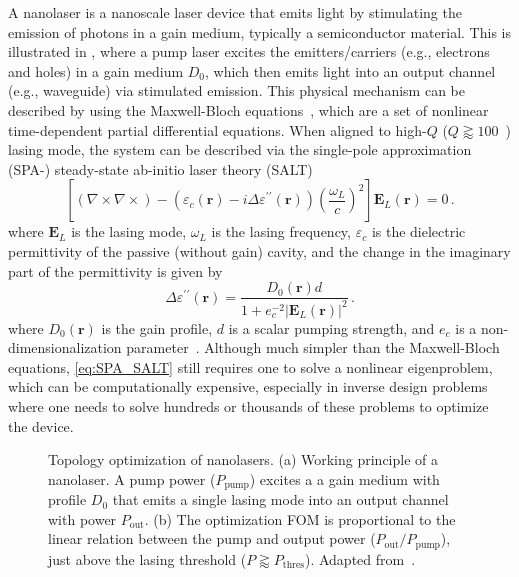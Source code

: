 A nanolaser is a nanoscale laser device that emits light by stimulating the emission of photons in a gain medium, typically a semiconductor material. This is illustrated
in , where a pump laser excites the emitters/carriers (e.g., electrons and holes) in a gain medium $D_0$, which then emits light into an output channel (e.g., waveguide) via
stimulated emission. This physical
mechanism can be described by using the Maxwell-Bloch equations~\cite{haken_laser_dynamics, PhysRev.134.A1429, SALT_original}, which are a set of nonlinear time-dependent 
partial differential equations. When aligned to high-$Q$ ($Q\gtrapprox 100$~\cite{cerjan_2016}) lasing
mode, the system can be described via the single-pole approximation (SPA-) steady-state ab-initio laser theory (SALT)~\cite{Ge_2010}
\begin{equation}\label{eq:SPA_SALT}
    {\left[(\nabla \times 
     \nabla \times ) -\left(\varepsilon_c(\mathbf{r})-i \Delta \varepsilon^{\prime \prime} (\mathbf{r})\right) \left(\frac{\omega_L}{c}\right)^2\right] \mathbf{E}_L(\mathbf{r})=0}\,.
\end{equation}
where $\mathbf{E}_L$ is the lasing mode, $\omega_L$ is the lasing frequency, $\varepsilon_c$ is the dielectric permittivity of the passive (without gain) cavity, and the change in the 
imaginary part of the permittivity is given by
\begin{equation}\label{eq:gain_SALT}
        \Delta \varepsilon^{\prime \prime} (\mathbf{r}) =  \frac{D_0(\mathbf{r}) d}{1+ e_c^{-2}\left|\mathbf{E}_L(\mathbf{r})\right|^2}\,.
\end{equation}
where $D_0(\mathbf{r})$ is the gain profile, $d$ is a scalar pumping strength, and $e_c$ is a non-dimensionalization parameter~\cite{Ge_2010}. Although much simpler than the Maxwell-Bloch equations, \eqref{eq:SPA_SALT} still
requires one to solve a nonlinear eigenproblem, which can be computationally expensive, especially in inverse design problems where one needs to solve hundreds or thousands of these problems to optimize the device.

\begin{figure}[tb]
    \centering
    \caption{Topology optimization of nanolasers. (a) Working principle of a nanolaser. A pump power ($P_\text{pump}$) excites a a gain medium with profile
    $D_0$ that emits a single lasing mode into an output channel with power $P_\text{out}$. (b) The optimization FOM is proportional to the linear relation between the pump and output power ($P_\text{out}/P_\text{pump}$),
    just above the lasing threshold ($P \gtrapprox P_\text{thres}$).  Adapted from~\cite{ownpub4}.}
    \label{fig:laser2d}
\end{figure}

